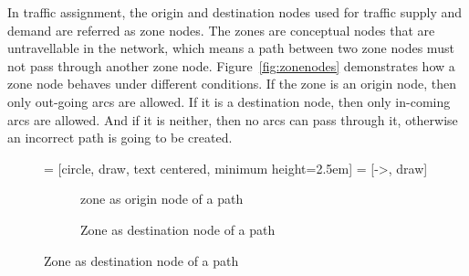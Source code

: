 In traffic assignment,
the origin and destination nodes used for traffic supply and demand are referred as zone nodes.
The zones are conceptual nodes that are untravellable in the network,
which means a path between two zone nodes must not pass through another zone node.
Figure~\ref{fig:zonenodes} demonstrates how a zone node behaves under different conditions.
If the zone is an origin node, then only out-going arcs are allowed.
If it is a destination node, then only in-coming arcs are allowed.
And if it is neither, then no arcs can pass through it, otherwise an incorrect path is going to be created.
\begin{figure}[!ht]
     = [circle, draw, text centered, minimum height=2.5em]
     = [->, draw]
    \centering
    \begin{subfigure}[b]{0.4\textwidth}
        \centering
        \caption{zone as origin node of a path}
    \end{subfigure}
    \quad
    \begin{subfigure}[b]{0.4\textwidth}
        \centering
        \caption{Zone as destination node of a path}
    \end{subfigure}


\end{figure}
